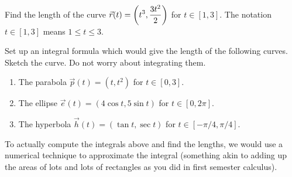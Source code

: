 \begin{problem} 
Find the length of the curve  $\displaystyle \vec r(t) = \left(t^3,\frac{3t^2}{2}\right)$ for $t\in[1,3]$. The notation $t\in[1,3]$ means $1\leq t\leq 3$. 
\end{problem}

\begin{problem}
Set up an integral formula which would give the length of the following curves. Sketch the curve. Do not worry about integrating them.  
\begin{enumerate}
\item The parabola $\vec p(t) = (t,t^2)$ for $t\in[0,3]$.
\item The ellipse $\vec e(t) = (4\cos t,5\sin t)$ for $t\in[0,2\pi]$.
\item The hyperbola $\vec h(t) = (\tan t,\sec t)$ for $t\in[-\pi/ 4,\pi/4]$.
\end{enumerate}
\end{problem}
To actually compute the integrals above and find the lengths, we would use a numerical technique to approximate the integral (something akin to adding up the areas of lots and lots of rectangles as you did in first semester calculus).




